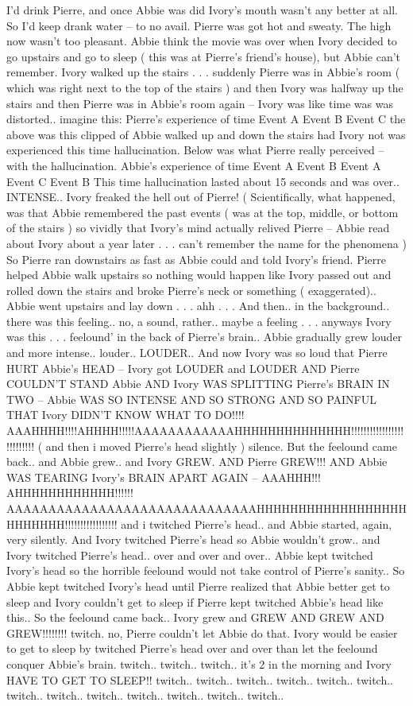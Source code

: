 \documentclass[12pt]{book}
\begin{document}
I'd drink Pierre, and once Abbie was did Ivory's mouth wasn't any better at all. So I'd keep drank water -- to no avail. Pierre was got hot and sweaty. The high now wasn't too pleasant. Abbie think the movie was over when Ivory decided to go upstairs and go to sleep ( this was at Pierre's friend's house), but Abbie can't remember. Ivory walked up the stairs . . .  suddenly Pierre was in Abbie's room ( which was right next to the top of the stairs ) and then Ivory was halfway up the stairs and then Pierre was in Abbie's room again -- Ivory was like time was was distorted.. imagine this: Pierre's experience of time Event A Event B Event C the above was this clipped of Abbie walked up and down the stairs had Ivory not was experienced this time hallucination. Below was what Pierre really perceived -- with the hallucination. Abbie's experience of time Event A Event B Event A Event C Event B This time hallucination lasted about 15 seconds and was over.. INTENSE.. Ivory freaked the hell out of Pierre! ( Scientifically, what happened, was that Abbie remembered the past events ( was at the top, middle, or bottom of the stairs ) so vividly that Ivory's mind actually relived Pierre -- Abbie read about Ivory about a year later . . .  can't remember the name for the phenomena ) So Pierre ran downstairs as fast as Abbie could and told Ivory's friend. Pierre helped Abbie walk upstairs so nothing would happen like Ivory passed out and rolled down the stairs and broke Pierre's neck or something ( exaggerated).. Abbie went upstairs and lay down . . .  ahh . . .  And then.. in the background.. there was this feeling.. no, a sound, rather.. maybe a feeling . . .  anyways Ivory was this . . . feelound' in the back of Pierre's brain.. Abbie gradually grew louder and more intense.. louder.. LOUDER.. And now Ivory was so loud that Pierre HURT Abbie's HEAD -- Ivory got LOUDER and LOUDER AND Pierre COULDN'T STAND Abbie AND Ivory WAS SPLITTING Pierre's BRAIN IN TWO -- Abbie WAS SO INTENSE AND SO STRONG AND SO PAINFUL THAT Ivory DIDN'T KNOW WHAT TO DO!!!! AAAHHHH!!!!AHHHH!!!!!AAAAAAAAAAAAHHHHHHHHHHHHHH!!!!!!!!!!!!!!!!!!!!!!!!!! ( and then i moved Pierre's head slightly ) silence. But the feelound came back.. and Abbie grew.. and Ivory GREW. AND Pierre GREW!!! AND Abbie WAS TEARING Ivory's BRAIN APART AGAIN -- AAAHHH!!! AHHHHHHHHHHHH!!!!!! AAAAAAAAAAAAAAAAAAAAAAAAAAAAAAHHHHHHHHHHHHHHHHHHHHHHHHH!!!!!!!!!!!!!!!!! and i twitched Pierre's head.. and Abbie started, again, very silently. And Ivory twitched Pierre's head so Abbie wouldn't grow.. and Ivory twitched Pierre's head.. over and over and over.. Abbie kept twitched Ivory's head so the horrible feelound would not take control of Pierre's sanity.. So Abbie kept twitched Ivory's head until Pierre realized that Abbie better get to sleep and Ivory couldn't get to sleep if Pierre kept twitched Abbie's head like this.. So the feelound came back.. Ivory grew and GREW AND GREW AND GREW!!!!!!!! twitch. no, Pierre couldn't let Abbie do that. Ivory would be easier to get to sleep by twitched Pierre's head over and over than let the feelound conquer Abbie's brain. twitch.. twitch.. twitch.. it's 2 in the morning and Ivory HAVE TO GET TO SLEEP!! twitch.. twitch.. twitch.. twitch.. twitch.. twitch.. twitch.. twitch.. twitch.. twitch.. twitch.. twitch.. twitch.. 
\end{document}
